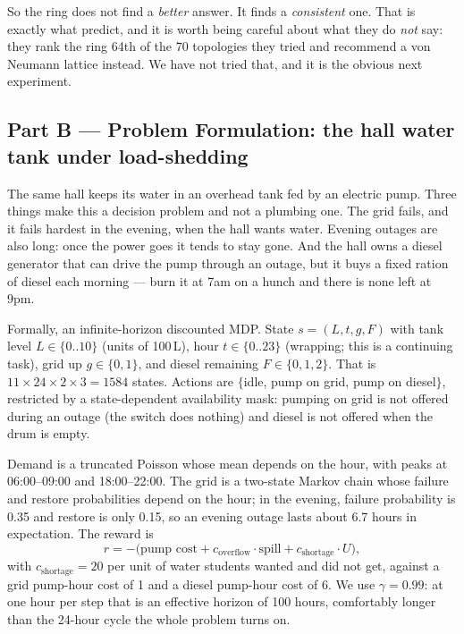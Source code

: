 \documentclass{ai-lab-report}
\begin{document}
So the ring does not find a \emph{better} answer. It finds a \emph{consistent} one. That is
exactly what \citet{kennedy2002population} predict, and it is worth being careful about what
they do \emph{not} say: they rank the ring 64th of the 70 topologies they tried and recommend a
von Neumann lattice instead. We have not tried that, and it is the obvious next experiment.

\subsection{Part B --- Problem Formulation: the hall water tank under load-shedding}
The same hall keeps its water in an overhead tank fed by an electric pump. Three things make
this a decision problem and not a plumbing one. The grid fails, and it fails hardest in the
evening, when the hall wants water. Evening outages are also long: once the power goes it tends
to stay gone. And the hall owns a diesel generator that can drive the pump through an outage,
but it buys a fixed ration of diesel each morning --- burn it at 7am on a hunch and there is
none left at 9pm.

Formally, an infinite-horizon discounted MDP. State $s = (L, t, g, F)$ with tank level
$L \in \{0..10\}$ (units of 100\,L), hour $t \in \{0..23\}$ (wrapping; this is a continuing
task), grid up $g \in \{0,1\}$, and diesel remaining $F \in \{0,1,2\}$. That is
$11 \times 24 \times 2 \times 3 = 1584$ states. Actions are $\{$idle, pump on grid, pump on
diesel$\}$, restricted by a state-dependent availability mask: pumping on grid is not offered
during an outage (the switch does nothing) and diesel is not offered when the drum is empty.

Demand is a truncated Poisson whose mean depends on the hour, with peaks at 06:00--09:00 and
18:00--22:00. The grid is a two-state Markov chain whose failure and restore probabilities
depend on the hour; in the evening, failure probability is 0.35 and restore is only 0.15, so an
evening outage lasts about 6.7 hours in expectation. The reward is
\begin{equation}
r = -\bigl(\text{pump cost} + c_{\text{overflow}}\cdot\text{spill}
    + c_{\text{shortage}}\cdot U\bigr),
\end{equation}
with $c_{\text{shortage}} = 20$ per unit of water students wanted and did not get, against a
grid pump-hour cost of 1 and a diesel pump-hour cost of 6. We use $\gamma = 0.99$: at one hour
per step that is an effective horizon of 100 hours, comfortably longer than the 24-hour cycle
the whole problem turns on.
\end{document}
